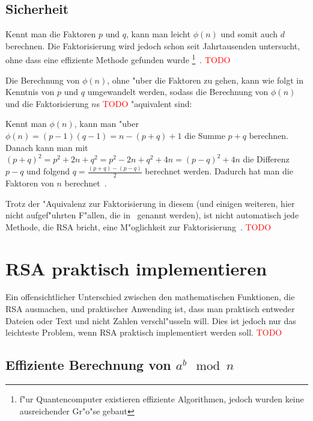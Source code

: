 \documentclass[12pt]{article}
\newcommand{\todo}[1]{\textcolor{red}{\mbox{TODO}}\marginpar{\textcolor{red}{#1}}}
\begin{document}
\subsection{Sicherheit}

Kennt man die Faktoren $p$ und $q$, kann man leicht $\phi(n)$ und somit auch $d$ berechnen.
Die Faktorisierung wird jedoch schon seit Jahrtausenden untersucht,
ohne dass eine effiziente Methode gefunden wurde%
\footnote{f"ur Quantencomputer existieren effiziente Algorithmen,
jedoch wurden keine ausreichender Gr"o"se gebaut}~\cite{rsa}. \todo{Reichen die Beispiele hier?}

Die Berechnung von $\phi(n)$, ohne "uber die Faktoren zu gehen,
kann wie folgt in Kenntnis von $p$ und $q$ umgewandelt werden, sodass die Berechnung von $\phi(n)$
und die Faktorisierung $n$s \todo{Besser aussehen lassen} "aquivalent sind:

Kennt man $\phi(n)$, kann man "uber $\phi(n) = (p-1)(q-1) = n - (p+q) + 1$
die Summe $p+q$ berechnen.
Danach kann man mit $(p+q)^2 = p^2 + 2n + q^2 = p^2 - 2n + q^2 + 4n = (p-q)^2 + 4n$
die Differenz $p-q$ und folgend $q = \frac{(p+q) - (p-q)}{2}$ berechnet werden.
Dadurch hat man die Faktoren von $n$ berechnet~\cite{rsa}.

Trotz der "Aquivalenz zur Faktorisierung in diesem (und einigen weiteren,
hier nicht aufgef"uhrten F"allen, die in~\cite{rsa} genannt werden),
ist nicht automatisch jede Methode, die RSA bricht, eine M"oglichkeit
zur Faktorisierung~\cite{sinews}.
\todo{Die Quelle bezieht sich auf doi:10.1.1.73.7840, lieber direkt zitieren?}

\section{RSA praktisch implementieren}

Ein offensichtlicher Unterschied zwischen den mathematischen Funktionen,
die RSA ausmachen, und praktischer Anwending ist, dass man praktisch entweder Dateien
oder Text und nicht Zahlen verschl"usseln will.
Dies ist jedoch nur das leichteste Problem, wenn RSA praktisch implementiert werden soll.
\todo{Mehr intro?}

\subsection{Effiziente Berechnung von $a^b \mod n$}
\end{document}
